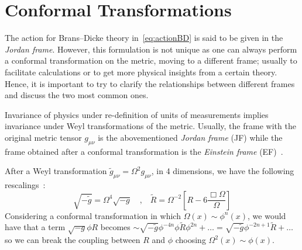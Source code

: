 \section{Conformal Transformations}\label{sec:conformaltransformations}
The action for Brans–Dicke theory in~\eqref{eq:actionBD} is said to be given in the \textit{Jordan frame}. However, this formulation is not unique as one can always perform a conformal transformation on the metric, moving to a different frame; usually to facilitate calculations or to get more physical insights from a certain theory.
Hence, it is important to try to clarify the relationships between different frames and discuss the two most common ones.

Invariance of physics under re-definition of units of measurements implies invariance under Weyl transformations of the metric.
Usually, the frame with the original metric tensor $g_{\mu\nu}$ is the abovementioned \textit{Jordan frame} (JF) while the frame obtained after a conformal transformation is the \textit{Einstein frame} (EF)~\cite{GiontiSJ:2023tgx}.

After a Weyl transformation $\tilde{g}_{\mu\nu} = \Omega^2 g_{\mu\nu}$, in 4 dimensions, we have the following rescalings~\cite{Faraoni:1998qx}:
\begin{equation}\label{eq:conformaltransformations}
    \sqrt{-\tilde{g}} = \Omega^{4} \sqrt{-g} \quad \text{,}\quad 
    \tilde{R} = \Omega^{-2} \left[ R - 6\frac{\Box \Omega}{\Omega} \right]
\end{equation}
Considering a conformal transformation in which $\Omega(x)\sim \phi^n(x)$, we would have that a term $\sqrt{-g}\phi R$ becomes
$\sim \sqrt{-\tilde{g}}\phi^{-4n}\phi \tilde{R} \phi^{2n} + \dots = \sqrt{-\tilde{g}}\phi^{-2n +1} \tilde{R} + \dots$ so we can break the coupling between $R$ and $\phi$ choosing 
$\Omega^2(x)\sim \phi(x)$.

